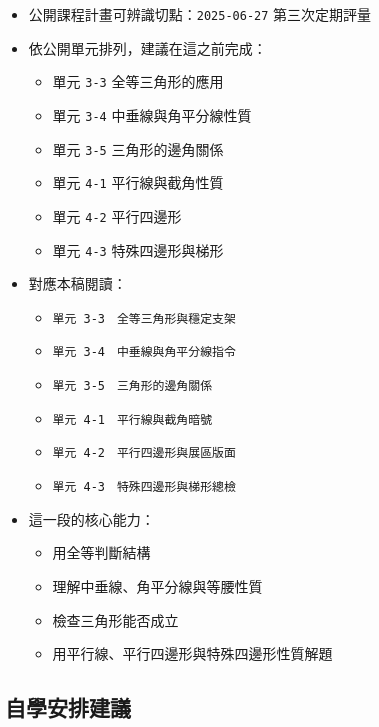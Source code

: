 \documentclass[
  chinese,
  12pt,
  a4paper,
  oneside]{article}
\providecommand{\tightlist}{%
  \setlength{\itemsep}{0pt}\setlength{\parskip}{0pt}}
\begin{document}
\begin{itemize}
\tightlist
\item
  公開課程計畫可辨識切點：\texttt{2025-06-27} 第三次定期評量
\item
  依公開單元排列，建議在這之前完成：

  \begin{itemize}
  \tightlist
  \item
    單元 \texttt{3-3} 全等三角形的應用
  \item
    單元 \texttt{3-4} 中垂線與角平分線性質
  \item
    單元 \texttt{3-5} 三角形的邊角關係
  \item
    單元 \texttt{4-1} 平行線與截角性質
  \item
    單元 \texttt{4-2} 平行四邊形
  \item
    單元 \texttt{4-3} 特殊四邊形與梯形
  \end{itemize}
\item
  對應本稿閱讀：

  \begin{itemize}
  \tightlist
  \item
    \texttt{單元\ 3-3　全等三角形與穩定支架}
  \item
    \texttt{單元\ 3-4　中垂線與角平分線指令}
  \item
    \texttt{單元\ 3-5　三角形的邊角關係}
  \item
    \texttt{單元\ 4-1　平行線與截角暗號}
  \item
    \texttt{單元\ 4-2　平行四邊形與展區版面}
  \item
    \texttt{單元\ 4-3　特殊四邊形與梯形總檢}
  \end{itemize}
\item
  這一段的核心能力：

  \begin{itemize}
  \tightlist
  \item
    用全等判斷結構
  \item
    理解中垂線、角平分線與等腰性質
  \item
    檢查三角形能否成立
  \item
    用平行線、平行四邊形與特殊四邊形性質解題
  \end{itemize}
\end{itemize}

\subsection{自學安排建議}\label{ux81eaux5b78ux5b89ux6392ux5efaux8b70}
\end{document}
